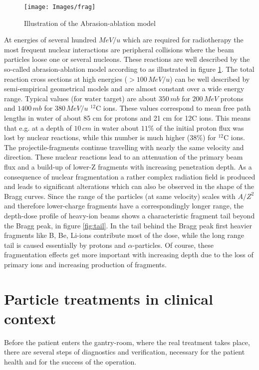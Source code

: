 \documentclass[12pt, a4paper, twoside]{book}
\begin{document}
\begin{figure}[!ht]
{\texttt{[image: Images/frag]}}
\caption{Illustration of the Abrasion-ablation model}
\label{fig:frag}
\end{figure}

At energies of several hundred $MeV/u$ which are required for radiotherapy the most frequent nuclear interactions are peripheral collisions where the beam particles loose one or several nucleons. These reactions are well described by the so-called abrasion-ablation model according to \cite{serb:nucRea} as illustrated in figure \ref{fig:frag}.
The total reaction cross sections at high energies ($>100\,MeV/u$) can be well described by semi-empirical geometrical models and are almost constant over a wide energy range. Typical values (for water target) are about $350\, mb$ for $200\,MeV$ protons and $1400\,mb$ for $380\,MeV/u$ $^{12}$C ions. These values correspond to mean free path lengths in water of about 85 cm for protons and 21 cm for 12C ions. This means that e.g. at a depth of $10\,cm$ in water about $11\%$ of the initial proton flux was lost by nuclear reactions, while this number is much higher ($38\%$) for $^{12}$C ions.
The projectile-fragments continue travelling with nearly the same velocity and direction. These nuclear reactions lead to an attenuation of the primary beam flux and a build-up of lower-Z fragments with increasing penetration depth.
As a consequence of nuclear fragmentation a rather complex radiation field is produced and leads to significant alterations which can also be observed in the shape of the Bragg curves. Since the range of the particles (at same velocity) scales with $A/Z^2$ and therefore lower-charge fragments have a correspondingly longer range, the depth-dose profile of heavy-ion beams shows a characteristic fragment tail beyond the Bragg peak, in figure \ref{fig:tail}.
In the tail behind the Bragg peak first heavier fragments like B, Be, Li-ions contribute most of the dose, while the long range tail is caused essentially by protons and $\alpha$-particles. Of course, these fragmentation effects get more important with increasing depth due to the loss of primary ions and increasing production of fragments.

\section{Particle treatments in clinical context}
Before the patient enters the gantry-room, where the real treatment takes place, there are several steps of diagnostics and verification, necessary for the patient health and for the success of the operation.
\end{document}
